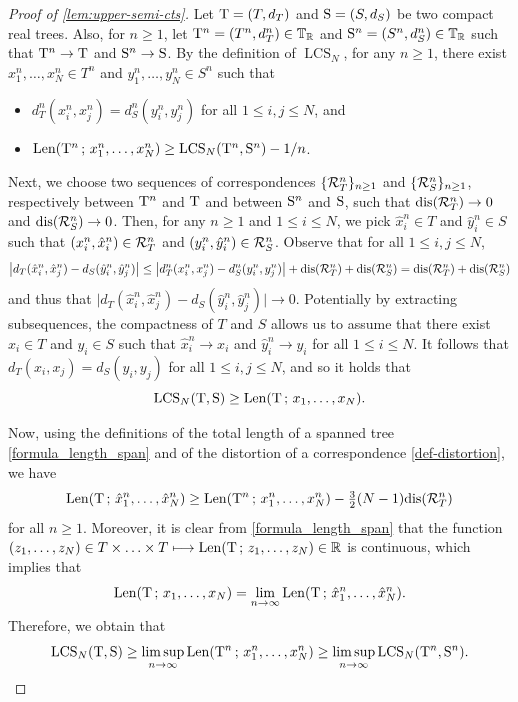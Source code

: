 \documentclass[11pt,reqno]{amsart}
\newcommand{\LCS}{\operatorname{LCS}}
\begin{document}
\begin{proof}[Proof of \cref{lem:upper-semi-cts}]
Let $\mathrm{T}=(T,d_T)$ and $\mathrm{S}=(S,d_S)$ be two compact real trees. Also, for $n \geq 1$, let $\mathrm{T}^n=(T^n,d_T^n)\in\mathbb{T}_{\mathbb{R}}$ and $\mathrm{S}^n=(S^n,d_S^n)\in\mathbb{T}_{\mathbb{R}}$ such that $\mathrm{T}^n\to\mathrm{T}$ and $\mathrm{S}^n\to\mathrm{S}$. By the definition of $\LCS_N$, for any $n\geq 1$, there exist $x_1^n,\ldots,x_N^n\in T^n$ and $y_1^n,\ldots,y_N^n\in S^n$ such that
\begin{itemize}
    \item $d_T^n(x_i^n,x_j^n)=d_S^n(y_i^n,y_j^n)$ for all $1\leq i,j\leq N$, and
    \item $\mathrm{Len}(\rT^n\, ;\, x_1^n,\ldots,x_N^n)\geq \LCS_N(\rT^n,\rS^n)-1/n$.
\end{itemize}
Next, we choose two sequences of correspondences $\{ {\mathcal R}_T^n\}_{n\geq 1}$ and $\{{\mathcal R}_S^n\}_{n\geq 1}$, respectively between $\mathrm{T}^n$ and $\mathrm{T}$ and between $\mathrm{S}^n$ and $\mathrm{S}$, such that $\mathrm{dis}({\mathcal R}_T^n)\to 0$ and $\mathrm{dis}({\mathcal R}_S^n)\to 0$. Then, for any $n\geq 1$ and $1\leq i\leq N$, we pick $\hat{x}_i^n\in T$ and $\hat{y}_i^n\in S$ such that $(x_i^n,\hat{x}_i^n)\in{\mathcal R}_T^n$ and $(y_i^n,\hat{y}_i^n)\in{\mathcal R}_S^n$. Observe that for all $1\leq i,j\leq N$,
\[\big|d_T(\hat{x}_i^n,\hat{x}_j^n)-d_S(\hat{y}_i^n,\hat{y}_j^n)\big|\leq \big|d_T^n({x}_i^n,{x}_j^n)-d_S^n({y}_i^n,{y}_j^n)\big|+\mathrm{dis}({\mathcal R}_T^n)+\mathrm{dis}({\mathcal R}_S^n)=\mathrm{dis}({\mathcal R}_T^n)+\mathrm{dis}({\mathcal R}_S^n)\]
and thus that $\big|d_T(\hat{x}_i^n,\hat{x}_j^n)-d_S(\hat{y}_i^n,\hat{y}_j^n)\big|\to 0$. Potentially by extracting subsequences, the compactness of $T$ and $S$ allows us to assume that there exist $x_i\in T$ and $y_i\in S$ such that $\hat{x}_i^n\to x_i$ and $\hat{y}_i^n\to y_i$ for all $1\leq i\leq N$. It follows that $d_T(x_i,x_j)=d_S(y_i,y_j)$ for all $1\leq i,j\leq N$, and so it holds that
\[\LCS_N(\rT,\rS)\geq \mathrm{Len}(\rT\, ;\, x_1,\ldots,x_N).\]

Now, using the definitions of the total length of a spanned tree \eqref{formula_length_span} and of the distortion of a correspondence \eqref{def-distortion}, we have
\[\mathrm{Len}(\mathrm{T}\, ;\, \hat{x}_1^n,\ldots,\hat{x}_N^n)\geq \mathrm{Len}(\mathrm{T}^n\, ;\, x_1^n,\ldots,x_N^n)-\tfrac{3}{2}(N-1)\mathrm{dis}({\mathcal R}_T^n)\]
for all $n\geq 1$. Moreover, it is clear from \eqref{formula_length_span} that the function $(z_1,\ldots,z_N)\in T\times \ldots\times T\longmapsto \mathrm{Len}(\mathrm{T}\, ;\, z_1,\ldots,z_N)\in \mathbb{R}$ is continuous, which implies that
\[\mathrm{Len}(\mathrm{T}\, ;\, x_1,\ldots,x_N)=\lim_{n\to\infty}\mathrm{Len}(\mathrm{T}\, ;\, \hat{x}_1^n,\ldots,\hat{x}_N^n).\]
Therefore, we obtain that
\[\LCS_N(\rT,\rS)\geq \limsup_{n\to\infty}\mathrm{Len}(\rT^n\, ;\, x_1^n,\ldots,x_N^n)\geq \limsup_{n\to\infty}\LCS_N(\rT^n,\rS^n).\qedhere\]
\end{proof}
\end{document}
